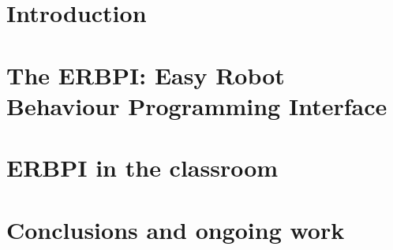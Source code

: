 \documentclass[runningheads,a4paper]{llncs}
\begin{document}
\section{Introduction}
\label{sec:intro}


\section{The ERBPI: Easy Robot Behaviour Programming Interface}
\label{sec:erbpi}


\section{ERBPI in the classroom}
\label{sec:experiments}


\section{Conclusions and ongoing work}
\label{sec:conclusion}



\end{document}
